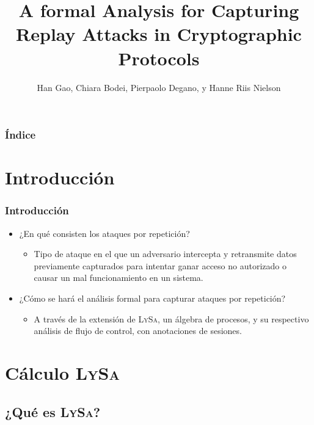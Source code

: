 \documentclass{beamer}
\title{A formal Analysis for Capturing Replay Attacks in Cryptographic Protocols}
\subtitle{}
\author{Han Gao, Chiara Bodei, Pierpaolo Degano, y Hanne Riis Nielson}
\institute{Katherine Sullivan \newline FCEIA - UNR}
\date{}
\begin{document}
\begin{frame}
    \titlepage
\end{frame}


\begin{frame}
    \frametitle{Índice}
    \tableofcontents
\end{frame}

\section{Introducción}
\begin{frame}
    \frametitle{Introducción}
    \pause
    \begin{itemize}
        \item<2-> ¿En qué consisten los ataques por repetición?
            \begin{itemize}
                \item<3-> Tipo de ataque en el que un adversario intercepta y retransmite datos previamente capturados para intentar ganar acceso no autorizado o causar un mal funcionamiento en un sistema.
            \end{itemize}
        \vspace{0.75cm}
        \item<4-> ¿Cómo se hará el análisis formal para capturar ataques por repetición?
            \begin{itemize}
                \item<5-> A través de la extensión de L\textsc{y}S\textsc{a}, un álgebra de procesos, y su respectivo análisis de flujo de control, con anotaciones de sesiones.
            \end{itemize}
    \end{itemize}
\end{frame}

\section{Cálculo L\textsc{y}S\textsc{a}}
\subsection{¿Qué es L\textsc{y}S\textsc{a}?}
\end{document}
